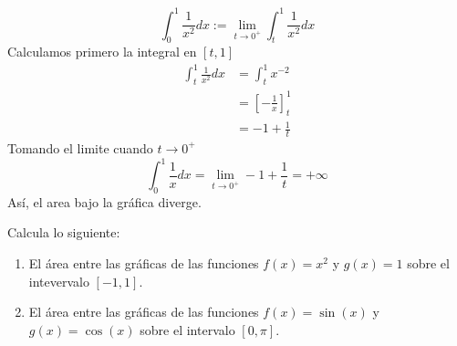 \documentclass[12pt,a4paper]{article}
\begin{document}
\begin{solucion}
\begin{enumerate}
\begin{enumerate}
                \begin{equation*}
                    \int_{0}^{1}\frac{1}{x^{2}}dx:=\lim_{t\to0^{+}}\int_{t}^{1}\frac{1}{x^{2}}dx
                \end{equation*}
                Calculamos primero la integral en $[t,1]$
                \begin{align*}
                    \int_{t}^{1}\frac{1}{x^{2}}dx&=\int_{t}^{1}x^{-2}\\
                    &=\left[-\frac{1}{x}\right]_{t}^{1}\\
                    &=-1+\frac{1}{t}
                \end{align*}
                Tomando el limite cuando $t\to0^{+}$
                \begin{equation*}
                    \int_{0}^{1}\frac{1}{x}dx=\lim_{t\to0^{+}}-1+\frac{1}{t}=+\infty
                \end{equation*}
                Así, el area bajo la gráfica diverge.
            \end{enumerate}
        \end{enumerate}
    \end{solucion}

    \begin{mdframed}[style=mdbluebox,frametitle={Ejercicio 5}]
        Calcula lo siguiente:
        \begin{enumerate}
            \item[(a)] El área entre las gráficas de las funciones $f(x)=x^{2}$ y $g(x)=1$ sobre el intevervalo
            $[-1,1]$.
            \item[(b)] El área entre las gráficas de las funciones $f(x)=\sin(x)$ y $g(x)=\cos(x)$ sobre el intervalo
            $[0,\pi]$.
        \end{enumerate}
    \end{mdframed}
\end{document}
